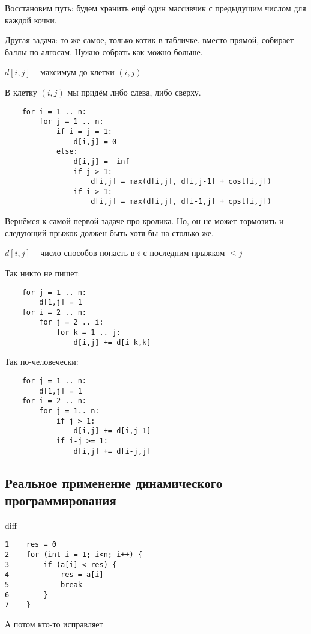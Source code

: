 \documentclass{book}
\theoremstyle{definition}
\begin{document}
Восстановим путь: будем хранить ещё один массивчик с предыдущим числом для каждой кочки.

Другая задача: то же самое, только котик в табличке. вместо прямой, собирает баллы по алгосам. Нужно собрать как можно больше.

$d[i,j]$ -- максимум до клетки  $(i,j)$

В клетку  $(i,j)$ мы придём либо слева, либо сверху.

\begin{verbatim}
    for i = 1 .. n:
        for j = 1 .. n:
            if i = j = 1:
                d[i,j] = 0
            else:
                d[i,j] = -inf
                if j > 1:
                    d[i,j] = max(d[i,j], d[i,j-1] + cost[i,j])
                if i > 1:
                    d[i,j] = max(d[i,j], d[i-1,j] + cpst[i,j])
\end{verbatim}

Вернёмся к самой первой задаче про кролика. Но, он не может тормозить и следующий прыжок должен быть хотя бы на столько же.

$d[i,j]$ -- число способов попасть в  $i$ с последним прыжком  $\leqslant j$

Так никто не пишет:

\begin{verbatim}
    for j = 1 .. n:
        d[1,j] = 1
    for i = 2 .. n:
        for j = 2 .. i:
            for k = 1 .. j:
                d[i,j] += d[i-k,k]
\end{verbatim}  

Так по-человечески:
\begin{verbatim}
    for j = 1 .. n:
        d[1,j] = 1
    for i = 2 .. n:
        for j = 1.. n:
            if j > 1:
                d[i,j] += d[i,j-1]
            if i-j >= 1:
                d[i,j] += d[i-j,j]
\end{verbatim}

\subsection{Реальное применение динамического программирования}

diff

\begin{verbatim}
1    res = 0
2    for (int i = 1; i<n; i++) {
3        if (a[i] < res) {
4            res = a[i]
5            break
6        }
7    }
\end{verbatim}

А потом кто-то исправляет
\end{document}
